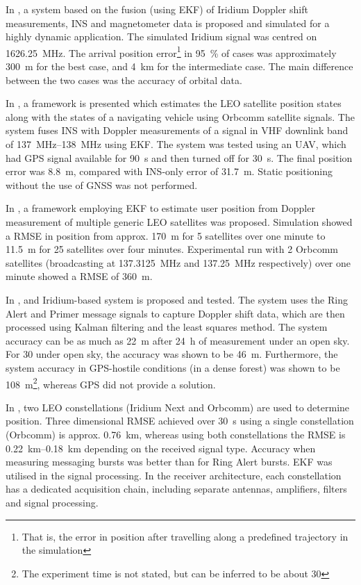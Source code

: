 In \cite{sop05}, a system based on the fusion (using EKF) of Iridium Doppler shift measurements, INS and magnetometer data is proposed and simulated for a highly dynamic application. The simulated Iridium signal was centred on \qty{1626.25}{\mega\hertz}. The arrival position error\footnote{That is, the error in position after travelling along a predefined trajectory in the simulation} in \qty{95}{\percent} of cases was approximately \qty{300}{\metre} for the best case, and \qty{4}{\km} for the intermediate case. The main difference between the two cases was the accuracy of orbital data.

In \cite{sop08}, a framework is presented which estimates the LEO satellite position states along with the states of a navigating vehicle using Orbcomm satellite signals. The system fuses INS with Doppler measurements of a signal in VHF downlink band of \qtyrange{137}{138}{\mega\hertz} using EKF. The system was tested using an UAV, which had GPS signal available for \qty{90}{\s} and then turned off for \qty{30}{\s}. The final position error was \qty{8.8}{\m}, compared with INS-only error of \qty{31.7}{\m}. Static positioning without the use of GNSS was not performed.

In \cite{sop10}, a framework employing EKF to estimate user position from Doppler measurement of multiple generic LEO satellites was proposed. Simulation showed a RMSE in position from approx. \qty{170}{\m} for 5 satellites over one minute to \qty{11.5}{\m} for 25 satellites over four minutes. Experimental run with 2 Orbcomm satellites (broadcasting at \qty{137.3125}{\mega\hertz} and \qty{137.25}{\mega\hertz} respectively) over one minute showed a RMSE of \qty{360}{\m}.

In \cite{sop11}, and Iridium-based system is proposed and tested. The system uses the Ring Alert and Primer message signals to capture Doppler shift data, which are then processed using Kalman filtering and the least squares method. The system accuracy can be as much as \qty{22}{\m} after \qty{24}{\hour} of measurement under an open sky. For \qty{30}{\min} under open sky, the accuracy was shown to be \qty{46}{\m}. Furthermore, the system accuracy in GPS-hostile conditions (in a dense forest) was shown to be \qty{108}{\m}\footnote{The experiment time is not stated, but can be inferred to be about \qty{30}{\min}}, whereas GPS did not provide a solution.

In \cite{sop03}, two LEO constellations (Iridium Next and Orbcomm) are used to determine position. Three dimensional RMSE achieved over \qty{30}{\s} using a single constellation (Orbcomm) is approx. \qty{0.76}{\km}, whereas using both constellations the RMSE is \qtyrange{0.22}{0.18}{\km} depending on the received signal type. Accuracy when measuring messaging bursts was better than for Ring Alert bursts. EKF was utilised in the signal processing. In the receiver architecture, each constellation has a dedicated acquisition chain, including separate antennas, amplifiers, filters and signal processing.


